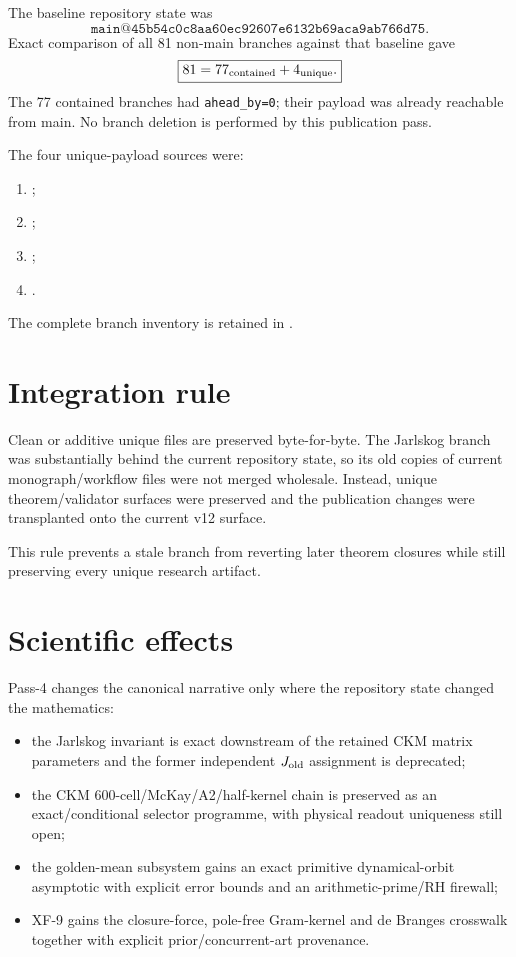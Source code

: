 The baseline repository state was
\[
\boxed{\texttt{main@45b54c0c8aa60ec92607e6132b69aca9ab766d75}.}
\]
Exact comparison of all 81 non-main branches against that baseline gave
\[
\boxed{
81=77_{\rm contained}+4_{\rm unique}.
}
\]
The 77 contained branches had \texttt{ahead\_by=0}; their payload was already
reachable from main.  No branch deletion is performed by this publication
pass.

The four unique-payload sources were:
\begin{enumerate}
\item {};
\item {};
\item {};
\item {}.
\end{enumerate}
The complete branch inventory is retained in
.

\section{Integration rule}

Clean or additive unique files are preserved byte-for-byte.  The Jarlskog branch
was substantially behind the current repository state, so its old copies of
current monograph/workflow files were not merged wholesale.  Instead, unique
theorem/validator surfaces were preserved and the publication changes were
transplanted onto the current v12 surface.

This rule prevents a stale branch from reverting later theorem closures while
still preserving every unique research artifact.

\section{Scientific effects}

Pass-4 changes the canonical narrative only where the repository state changed
the mathematics:
\begin{itemize}
\item the Jarlskog invariant is exact downstream of the retained CKM matrix
      parameters and the former independent \(J_{\rm old}\) assignment is
      deprecated;
\item the CKM 600-cell/McKay/A2/half-kernel chain is preserved as an
      exact/conditional selector programme, with physical readout uniqueness
      still open;
\item the golden-mean subsystem gains an exact primitive dynamical-orbit
      asymptotic with explicit error bounds and an arithmetic-prime/RH
      firewall;
\item XF-9 gains the closure-force, pole-free Gram-kernel and de Branges
      crosswalk together with explicit prior/concurrent-art provenance.
\end{itemize}

